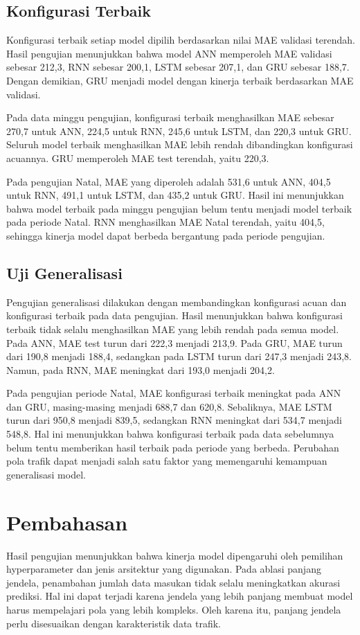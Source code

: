 \documentclass[conference,a4paper]{IEEEtran}
\begin{document}
\subsection{Konfigurasi Terbaik}
Konfigurasi terbaik setiap model dipilih berdasarkan nilai MAE validasi terendah. Hasil pengujian menunjukkan bahwa model ANN memperoleh MAE validasi sebesar 212,3, RNN sebesar 200,1, LSTM sebesar 207,1, dan GRU sebesar 188,7. Dengan demikian, GRU menjadi model dengan kinerja terbaik berdasarkan MAE validasi.

Pada data minggu pengujian, konfigurasi terbaik menghasilkan MAE sebesar 270,7 untuk ANN, 224,5 untuk RNN, 245,6 untuk LSTM, dan 220,3 untuk GRU. Seluruh model terbaik menghasilkan MAE lebih rendah dibandingkan konfigurasi acuannya. GRU memperoleh MAE test terendah, yaitu 220,3.

Pada pengujian Natal, MAE yang diperoleh adalah 531,6 untuk ANN, 404,5 untuk RNN, 491,1 untuk LSTM, dan 435,2 untuk GRU. Hasil ini menunjukkan bahwa model terbaik pada minggu pengujian belum tentu menjadi model terbaik pada periode Natal. RNN menghasilkan MAE Natal terendah, yaitu 404,5, sehingga kinerja model dapat berbeda bergantung pada periode pengujian.
\subsection{Uji Generalisasi}
Pengujian generalisasi dilakukan dengan membandingkan konfigurasi acuan dan konfigurasi terbaik pada data pengujian. Hasil menunjukkan bahwa konfigurasi terbaik tidak selalu menghasilkan MAE yang lebih rendah pada semua model. Pada ANN, MAE test turun dari 222,3 menjadi 213,9. Pada GRU, MAE turun dari 190,8 menjadi 188,4, sedangkan pada LSTM turun dari 247,3 menjadi 243,8. Namun, pada RNN, MAE meningkat dari 193,0 menjadi 204,2.

Pada pengujian periode Natal, MAE konfigurasi terbaik meningkat pada ANN dan GRU, masing-masing menjadi 688,7 dan 620,8. Sebaliknya, MAE LSTM turun dari 950,8 menjadi 839,5, sedangkan RNN meningkat dari 534,7 menjadi 548,8. Hal ini menunjukkan bahwa konfigurasi terbaik pada data sebelumnya belum tentu memberikan hasil terbaik pada periode yang berbeda. Perubahan pola trafik dapat menjadi salah satu faktor yang memengaruhi kemampuan generalisasi model.
\section{Pembahasan}
Hasil pengujian menunjukkan bahwa kinerja model dipengaruhi oleh pemilihan hyperparameter dan jenis arsitektur yang digunakan. Pada ablasi panjang jendela, penambahan jumlah data masukan tidak selalu meningkatkan akurasi prediksi. Hal ini dapat terjadi karena jendela yang lebih panjang membuat model harus mempelajari pola yang lebih kompleks. Oleh karena itu, panjang jendela perlu disesuaikan dengan karakteristik data trafik.
\end{document}

